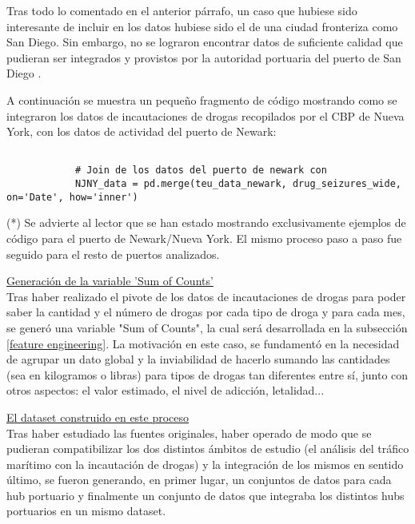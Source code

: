\documentclass[12pt]{article}
\begin{document}
		Tras todo lo comentado en el anterior párrafo, un caso que hubiese sido interesante de incluir en los datos hubiese sido el de una ciudad fronteriza como San Diego. Sin embargo, no se lograron encontrar datos de suficiente calidad que pudieran ser integrados y provistos por la autoridad portuaria del puerto de San Diego \cite{portofsandiego2025}.
		
		A continuación se muestra un pequeño fragmento de código mostrando como se integraron los datos de incautaciones de drogas recopilados por el CBP de Nueva York, con los datos de actividad del puerto de Newark:
		
		\begin{verbatim}
			
			# Join de los datos del puerto de newark con 
			NJNY_data = pd.merge(teu_data_newark, drug_seizures_wide, on='Date', how='inner')
		\end{verbatim}
	
		(*) Se advierte al lector que se han estado mostrando exclusivamente ejemplos de código para el puerto de Newark/Nueva York. El mismo proceso paso a paso fue seguido para el resto de puertos analizados.
		
		\underline{Generación de la variable 'Sum of Counts'}\\
		Tras haber realizado el pivote de los datos de incautaciones de drogas para poder saber la cantidad y el número de drogas por cada tipo de droga y para cada mes, se generó una variable "Sum of Counts", la cual será desarrollada en la subsección \ref{feature engineering}. La motivación en este caso, se fundamentó en la necesidad de agrupar un dato global y la inviabilidad de hacerlo sumando las cantidades (sea en kilogramos o libras) para tipos de drogas tan diferentes entre sí, junto con otros aspectos: el valor estimado, el nivel de adicción, letalidad...
		 
		\underline{El dataset construido en este proceso}\\
		Tras haber estudiado las fuentes originales, haber operado de modo que se pudieran compatibilizar los dos distintos ámbitos de estudio (el análisis del tráfico marítimo con la incautación de drogas) y la integración de los mismos en sentido último, se fueron generando, en primer lugar, un conjuntos de datos para cada hub portuario y finalmente un conjunto de datos que integraba los distintos hubs portuarios en un mismo dataset.\cite{} 
		
		
\end{document}
